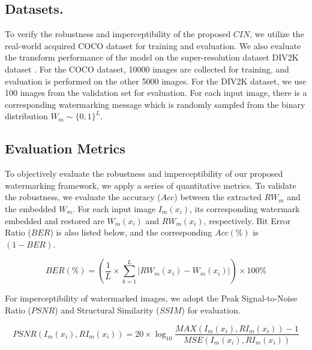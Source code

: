 \documentclass[sigconf]{acmart}
\begin{document}
\subsection{Datasets.}
To verify the robustness and imperceptibility of the proposed $CIN$, we utilize the real-world acquired COCO dataset \cite{lin2014microsoft} for training and evaluation. We also evaluate the transform performance of the model on the super-resolution dataset DIV2K dataset \cite{agustsson2017ntire}. For the COCO dataset, 10000 images are collected for training, and evaluation is performed on the other 5000 images. For the DIV2K dataset, we use 100 images from the validation set for evaluation. For each input image, there is a corresponding watermarking message which is randomly sampled from the binary distribution $W_{m} \sim\{0,1\}^{L}$.





\subsection{Evaluation Metrics}
To objectively evaluate the robustness and imperceptibility of our proposed watermarking framework, we apply a series of quantitative metrics. To validate the robustness, we evaluate the accuracy ($Acc$) between the extracted $RW_{m}$ and the embedded $W_{m}$. For each input image $I_{m}(x_{i})$, its corresponding watermark embedded and restored are $W_{m}(x_{i})$ and $RW_{m}(x_{i})$, respectively. Bit Error Ratio ($BER$) is also listed below, and the corresponding $Acc(\%)$ is $(1-BER)$.

\begin{equation}
    BER(\%) = (\frac{1}{L}\times\displaystyle\sum\limits_{k=1}^L   |RW_{m}(x_{i})-W_{m}(x_{i})|) \times 100\% 
    \label{BER}
\end{equation}

For imperceptibility of watermarked images, we adopt the Peak Signal-to-Noise Ratio ($PSNR$) and Structural Similarity ($SSIM$) for evaluation. 


\begin{equation}
    PSNR(I_{m}(x_{i}), RI_{m}(x_{i})) = 20 \times \log_{10}{\frac{MAX(I_{m}(x_{i}),RI_{m}(x_{i}))-1}{MSE(I_{m}(x_{i}), RI_{m}(x_{i}))}} 
    \label{PSNR}
\end{equation}
\end{document}
